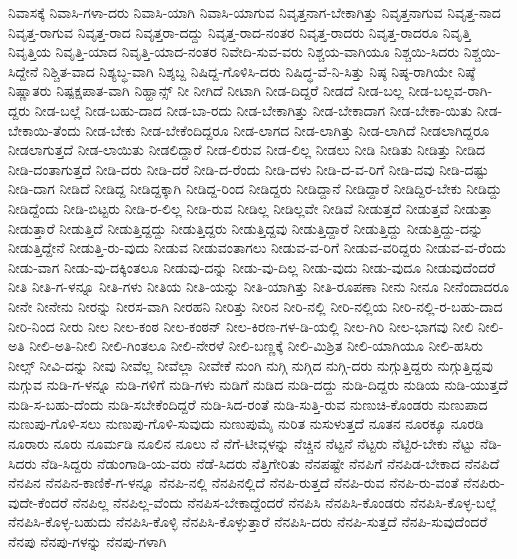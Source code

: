 {ನಿವಾಸಕ್ಕೆ
ನಿವಾಸಿ-ಗಳಾ-ದರು
ನಿವಾಸಿ-ಯಾಗಿ
ನಿವಾಸಿ-ಯಾಗುವ
ನಿವೃತ್ತನಾಗ-ಬೇಕಾಗಿತ್ತು
ನಿವೃತ್ತನಾಗುವ
ನಿವೃತ್ತ-ನಾದ
ನಿವೃತ್ತ-ರಾಗುವ
ನಿವೃತ್ತ-ರಾದ
ನಿವೃತ್ತರಾ-ದದ್ದು
ನಿವೃತ್ತ-ರಾದ-ನಂತರ
ನಿವೃತ್ತ-ರಾದರು
ನಿವೃತ್ತ-ರಾದರೂ
ನಿವೃತ್ತಿ
ನಿವೃತ್ತಿಯ
ನಿವೃತ್ತಿ-ಯಾದ
ನಿವೃತ್ತಿ-ಯಾದ-ನಂತರ
ನಿವೇದಿ-ಸುವ-ವರು
ನಿಶ್ಚಯ-ವಾಗಿಯೂ
ನಿಶ್ಚಯಿ-ಸಿದರು
ನಿಶ್ಚಯಿ-ಸಿದ್ದೇನೆ
ನಿಶ್ಚಿತ-ವಾದ
ನಿಶ್ಯಬ್ಧ-ವಾಗಿ
ನಿಶ್ಶಬ್ದ
ನಿಷಿದ್ದ-ಗೊಳಿಸಿ-ದರು
ನಿಷಿದ್ಧ-ವೆ-ನಿ-ಸಿತ್ತು
ನಿಷ್ಠ
ನಿಷ್ಠ-ರಾಗಿಯೇ
ನಿಷ್ಠೆ
ನಿಷ್ಣಾತರು
ನಿಷ್ಪಕ್ಷಪಾತ-ವಾಗಿ
ನಿಹ್ಹಾನ್ಸ್
ನೀ
ನೀಗಿದೆ
ನೀಟಾಗಿ
ನೀಡ-ದಿದ್ದರೆ
ನೀಡದೆ
ನೀಡ-ಬಲ್ಲ
ನೀಡ-ಬಲ್ಲವ-ರಾಗಿ-ದ್ದರು
ನೀಡ-ಬಲ್ಲೆ
ನೀಡ-ಬಹು-ದಾದ
ನೀಡ-ಬಾ-ರದು
ನೀಡ-ಬೇಕಾಗಿತ್ತು
ನೀಡ-ಬೇಕಾದಾಗ
ನೀಡ-ಬೇಕಾ-ಯಿತು
ನೀಡ-ಬೇಕಾಯಿ-ತೆಂದು
ನೀಡ-ಬೇಕು
ನೀಡ-ಬೇಕೆಂದಿದ್ದರೂ
ನೀಡ-ಲಾಗದ
ನೀಡ-ಲಾಗಿತ್ತು
ನೀಡ-ಲಾಗಿದೆ
ನೀಡಲಾಗಿದ್ದರೂ
ನೀಡಲಾಗುತ್ತದೆ
ನೀಡ-ಲಾಯಿತು
ನೀಡಲಿದ್ದಾರೆ
ನೀಡ-ಲಿರುವ
ನೀಡ-ಲಿಲ್ಲ
ನೀಡಲು
ನೀಡಿ
ನೀಡಿತು
ನೀಡಿತ್ತು
ನೀಡಿದ
ನೀಡಿ-ದಂತಾಗುತ್ತದೆ
ನೀಡಿ-ದರು
ನೀಡಿ-ದರೆ
ನೀಡಿ-ದ-ರೆಂದು
ನೀಡಿ-ದಳು
ನೀಡಿ-ದ-ವ-ರಿಗೆ
ನೀಡಿ-ದವು
ನೀಡಿ-ದಷ್ಟು
ನೀಡಿ-ದಾಗ
ನೀಡಿದೆ
ನೀಡಿದ್ದ
ನೀಡಿದ್ದಕ್ಕಾಗಿ
ನೀಡಿದ್ದ-ರಿಂದ
ನೀಡಿದ್ದರು
ನೀಡಿದ್ದಾನೆ
ನೀಡಿದ್ದಾರೆ
ನೀಡಿದ್ದಿರ-ಬೇಕು
ನೀಡಿದ್ದು
ನೀಡಿದ್ದೆಂದು
ನೀಡಿ-ಬಿಟ್ಟರು
ನೀಡಿ-ರ-ಲಿಲ್ಲ
ನೀಡಿ-ರುವ
ನೀಡಿಲ್ಲ
ನೀಡಿಲ್ಲವೇ
ನೀಡಿವೆ
ನೀಡುತ್ತದೆ
ನೀಡುತ್ತವೆ
ನೀಡುತ್ತಾ
ನೀಡುತ್ತಾರೆ
ನೀಡುತ್ತಿದೆ
ನೀಡುತ್ತಿದ್ದದ್ದು
ನೀಡುತ್ತಿದ್ದರು
ನೀಡುತ್ತಿದ್ದವು
ನೀಡುತ್ತಿದ್ದಾರೆ
ನೀಡುತ್ತಿದ್ದು
ನೀಡುತ್ತಿದ್ದು-ದನ್ನು
ನೀಡುತ್ತಿದ್ದೇನೆ
ನೀಡುತ್ತಿ-ರು-ವುದು
ನೀಡುವ
ನೀಡುವಂತಾಗಲು
ನೀಡುವ-ವ-ರಿಗೆ
ನೀಡುವ-ವರಿದ್ದರು
ನೀಡುವ-ವ-ರೆಂದು
ನೀಡು-ವಾಗ
ನೀಡು-ವು-ದಕ್ಕಿಂತಲೂ
ನೀಡುವು-ದನ್ನು
ನೀಡು-ವು-ದಿಲ್ಲ
ನೀಡು-ವುದು
ನೀಡು-ವುದೂ
ನೀಡುವುದೆಂದರೆ
ನೀತಿ
ನೀತಿ-ಗ-ಳನ್ನೂ
ನೀತಿ-ಗಳು
ನೀತಿಯ
ನೀತಿ-ಯನ್ನು
ನೀತಿ-ಯಾಗಿತ್ತು
ನೀತಿ-ರೂಪಣಾ
ನೀನು
ನೀನೂ
ನೀನೆಂದಾದರೂ
ನೀನೇ
ನೀನೇನು
ನೀರನ್ನು
ನೀರಸ-ವಾಗಿ
ನೀರಹನಿ
ನೀರಿತ್ತು
ನೀರಿನ
ನೀರಿ-ನಲ್ಲಿ
ನೀರಿ-ನಲ್ಲಿಯ
ನೀರಿ-ನಲ್ಲಿ-ರ-ಬಹು-ದಾದ
ನೀರಿ-ನಿಂದ
ನೀರು
ನೀಲ
ನೀಲ-ಕಂಠ
ನೀಲ-ಕಂಠನ್
ನೀಲ-ಕಿರಣ-ಗಳ-ಡಿ-ಯಲ್ಲಿ
ನೀಲ-ಗಿರಿ
ನೀಲ-ಭಾಗವು
ನೀಲಿ
ನೀಲಿ-ಅತಿ
ನೀಲಿ-ಅತಿ-ನೀಲಿ
ನೀಲಿ-ಗಿಂತಲೂ
ನೀಲಿ-ನೇರಳೆ
ನೀಲಿ-ಬಣ್ಣಕ್ಕೆ
ನೀಲಿ-ಮಿಶ್ರಿತ
ನೀಲಿ-ಯಾಗಿಯೂ
ನೀಲಿ-ಹಸಿರು
ನೀಲ್ಸ್
ನೀವಿ-ದನ್ನು
ನೀವು
ನೀವೆಲ್ಲ
ನೀವೆಲ್ಲಾ
ನೀವೇಕೆ
ನುಂಗಿ
ನುಗ್ಗಿ
ನುಗ್ಗಿದ
ನುಗ್ಗಿ-ದರು
ನುಗ್ಗುತ್ತಿದ್ದರು
ನುಗ್ಗುತ್ತಿದ್ದವು
ನುಗ್ಗುವ
ನುಡಿ-ಗ-ಳನ್ನೂ
ನುಡಿ-ಗಳಿಗೆ
ನುಡಿ-ಗಳು
ನುಡಿಗೆ
ನುಡಿದ
ನುಡಿ-ದದ್ದು
ನುಡಿ-ದಿದ್ದರು
ನುಡಿಯ
ನುಡಿ-ಯುತ್ತದೆ
ನುಡಿ-ಸ-ಬಹು-ದೆಂದು
ನುಡಿ-ಸಬೇಕೆಂದಿದ್ದರೆ
ನುಡಿ-ಸಿದ-ರಂತೆ
ನುಡಿ-ಸುತ್ತಿ-ರುವ
ನುಣುಚಿ-ಕೊಂಡರು
ನುಣುಪಾದ
ನುಣುಪು-ಗೊಳಿ-ಸಲು
ನುಣುಪು-ಗೊಳಿ-ಸುವುದು
ನುಣುಪುಮೈ
ನುರಿತ
ನುಸುಳುತ್ತದೆ
ನೂತನ
ನೂರಕ್ಕೂ
ನೂರಡಿ
ನೂರಾರು
ನೂರು
ನೂರ್ಮಡಿ
ನೂಲಿನ
ನೂಲು
ನೆ
ನೆಗೆ-ಟೀವ್ಗಳನ್ನು
ನೆಚ್ಚಿನ
ನೆಟ್ಟನೆ
ನೆಟ್ಟರು
ನೆಟ್ಟಿರ-ಬೇಕು
ನೆಟ್ಟು
ನೆಡಿ-ಸಿದರು
ನೆಡಿ-ಸಿದ್ದರು
ನೆಡುಂಗಾಡಿ-ಯ-ವರು
ನೆಡೆ-ಸಿದರು
ನೆತ್ತಿಗೇರಿತು
ನೆನಪಷ್ಟೇ
ನೆನಪಿಗೆ
ನೆನಪಿಡ-ಬೇಕಾದ
ನೆನಪಿದೆ
ನೆನಪಿನ
ನೆನಪಿನ-ಕಾಣಿಕೆ-ಗ-ಳನ್ನೂ
ನೆನಪಿ-ನಲ್ಲಿ
ನೆನಪಿನಲ್ಲಿದೆ
ನೆನಪಿ-ರುತ್ತದೆ
ನೆನಪಿ-ರುವ
ನೆನಪಿ-ರು-ವಂತೆ
ನೆನಪಿರು-ವುದೇ-ಕೆಂದರೆ
ನೆನಪಿಲ್ಲ
ನೆನಪಿಲ್ಲ-ವೆಂದು
ನೆನಪಿಸ-ಬೇಕಾದ್ದೆಂದರೆ
ನೆನಪಿಸಿ
ನೆನಪಿಸಿ-ಕೊಂಡರು
ನೆನಪಿಸಿ-ಕೊಳ್ಳ-ಬಲ್ಲೆ
ನೆನಪಿಸಿ-ಕೊಳ್ಳ-ಬಹುದು
ನೆನಪಿಸಿ-ಕೊಳ್ಳಿ
ನೆನಪಿಸಿ-ಕೊಳ್ಳುತ್ತಾರೆ
ನೆನಪಿಸಿ-ದರು
ನೆನಪಿ-ಸುತ್ತದೆ
ನೆನಪಿ-ಸುವುದೆಂದರೆ
ನೆನಪು
ನೆನಪು-ಗಳನ್ನು
ನೆನಪು-ಗಳಾಗಿ
}
